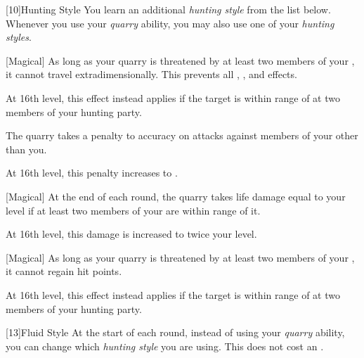             [10]{Hunting Style}
            You learn an additional \textit{hunting style} from the list below.
            Whenever you use your \textit{quarry} ability, you may also use one of your \textit{hunting styles}.
            {
                [Magical]
                As long as your quarry is threatened by at least two members of your , it cannot travel extradimensionally.
                This prevents all , , and  effects.

                At 16th level, this effect instead applies if the target is within \rngmed range of at two members of your hunting party.

                The quarry takes a  penalty to accuracy on attacks against members of your  other than you.

                At 16th level, this penalty increases to .

                [Magical]
                At the end of each round, the quarry takes life damage equal to your level if at least two members of your  are within \rngmed range of it.

                At 16th level, this damage is increased to twice your level.

                [Magical]
                As long as your quarry is threatened by at least two members of your , it cannot regain hit points.

                At 16th level, this effect instead applies if the target is within \rngmed range of at two members of your hunting party.
            }

            [13]{Fluid Style}
            At the start of each round, instead of using your \textit{quarry} ability, you can change which \textit{hunting style} you are using.
            This does not cost an .


